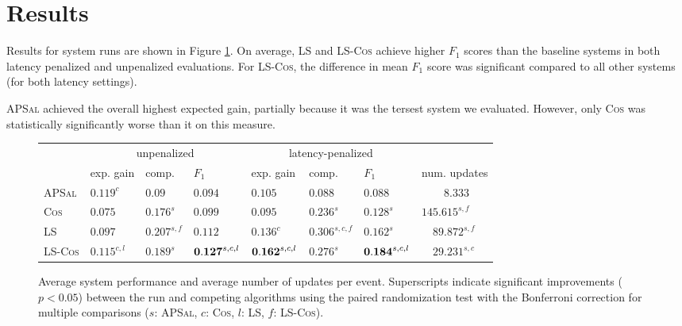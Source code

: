  \section{Results} \label{sec:results}

  Results for system runs are shown in Figure \ref{fig:results}.  On average,
 \textsc{LS} and \textsc{LS-Cos} achieve higher $F_1$ scores than the baseline
 systems in both latency penalized and unpenalized evaluations. For
 \textsc{LS-Cos}, the difference in mean $F_1$ score was significant compared
 to all other systems (for both latency settings).
 
  \textsc{APSal} achieved the overall highest expected gain, partially because
 it was the tersest system we evaluated. However, only \textsc{Cos} was
 statistically significantly worse than it on this measure. %

\begin{figure}
    \center
\begin{tabular}{ l | l l l | l l l | l }
   &\multicolumn{3}{c|}{unpenalized}&\multicolumn{3}{c|}{latency-penalized}&\\
   & exp. gain     & comp. & $F_1$ & exp. gain     & comp. & $F_1$ & num. updates\\
    \hline
\textsc{APSal}      
    & $\mathbf{0.119}^c$ & $0.09$                     & $0.094$ 
    & $0.105$            & $0.088$                    & $0.088$ 
    & ~~~~$8.333$ \\
\textsc{Cos}     
    & $0.075$            & $0.176^{s}$              & $0.099$ 
    & $0.095$            & $0.236^{s}$              & $0.128^{s}$ 
    & $145.615^{s,f}$ \\
\textsc{LS}       
    & $0.097$            & $\mathbf{0.207}^{s,f}$   & $0.112$ 
    & $0.136^{c}$      & $\mathbf{0.306}^{s,c,f}$ & $0.162^{s}$
    & ~~$89.872^{s,f}$ \\
\textsc{LS-Cos}
    & $0.115^{c,l}$        & $0.189^{s}$ & ${\bf0.127}^{s,c,l}$
    & ${\bf0.162}^{s,c,l}$ & $0.276^{s}$ & ${\bf0.184}^{s,c,l}$
 & ~~$29.231^{s,c}$ \\
\end{tabular}
\caption{
 Average system performance 
 and average number of updates per event.
 Superscripts indicate significant improvements ($p < 0.05$) between the run and
 competing algorithms using the 
  paired randomization test with the Bonferroni correction for multiple 
  comparisons ($s$: \textsc{APSal}, 
 $c$: \textsc{Cos}, $l$: \textsc{LS}, $f$: \textsc{LS-Cos}). 
}
\label{fig:results}
\end{figure}


